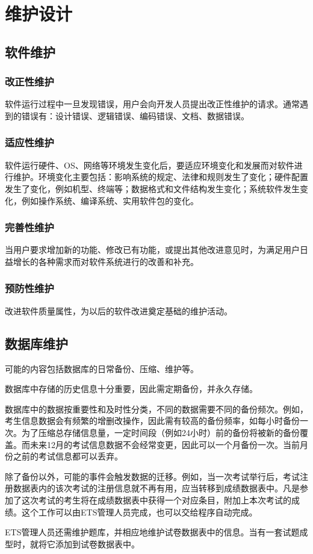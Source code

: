 \chapter{维护设计}

\section{软件维护}
\subsection{改正性维护}
软件运行过程中一旦发现错误，用户会向开发人员提出改正性维护的请求。通常遇到的错误有：设计错误、逻辑错误、编码错误、文档、数据错误。

\subsection{适应性维护}
软件运行硬件、OS、网络等环境发生变化后，要适应环境变化和发展而对软件进行维护。环境变化主要包括：影响系统的规定、法律和规则发生了变化；硬件配置发生了变化，例如机型、终端等；数据格式和文件结构发生变化；系统软件发生变化，例如操作系统、编译系统、实用软件包的变化。

\subsection{完善性维护}
当用户要求增加新的功能、修改已有功能，或提出其他改进意见时，为满足用户日益增长的各种需求而对软件系统进行的改善和补充。

\subsection{预防性维护}
改进软件质量属性，为以后的软件改进奠定基础的维护活动。

\section{数据库维护}
可能的内容包括数据库的日常备份、压缩、维护等。

数据库中存储的历史信息十分重要，因此需定期备份，并永久存储。

数据库中的数据按重要性和及时性分类，不同的数据需要不同的备份频次。例如，考生信息数据会有频繁的增删改操作，因此需有较高的备份频率，如每小时备份一次。为了压缩总存储信息量，一定时间段（例如24小时）前的备份将被新的备份覆盖。而未来12月的考试信息数据不会经常变更，因此可以一个月备份一次。当前月份之前的考试信息都可以丢弃。

除了备份以外，可能的事件会触发数据的迁移。例如，当一次考试举行后，考试注册数据表内的该次考试的注册信息就不再有用，应当转移到成绩数据表中。凡是参加了这次考试的考生将在成绩数据表中获得一个对应条目，附加上本次考试的成绩。这个工作可以由ETS管理人员完成，也可以交给程序自动完成。

ETS管理人员还需维护题库，并相应地维护试卷数据表中的信息。当有一套试题成型时，就将它添加到试卷数据表中。